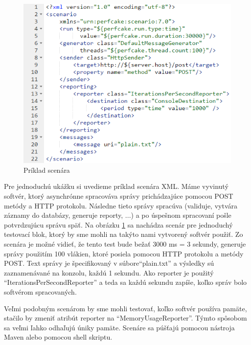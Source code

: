 
\begin{figure} [!htb]
\centering
\includegraphics[width=0.9\linewidth]{scenario.png} 
\caption{Príklad scenára}\label{scenario}
\end{figure}
Pre jednoduchú ukážku si uvedieme príklad scenára XML. Máme vyvinutý softvér, ktorý asynchrónne spracováva správy prichádzajúce pomocou POST metódy a HTTP protokolu. Následne tieto správy spracúva (validuje, vytvára záznamy do databázy, generuje reporty, ...) a po úspešnom spracovaní pošle potvrdzujúcu správu späť.
Na obrázku \ref{scenario} sa nachádza scenár pre jednoduchý testovací blok, ktorý by sme mohli na takýto nami vytvorený softvér použiť. Zo scenára je možné vidieť, že tento test bude bežať 3000 ms = 3 sekundy, generuje správy použitím 100 vlákien, ktoré posiela pomocou HTTP protokolu a metódy POST. Text správy je špecifikovaný v súbore``plain.txt'' a výsledky sú zaznamenávané na konzolu, každú 1 sekundu. Ako reporter je použitý ``IterationsPerSecondReporter'' a teda sa každú sekundu zapíše, koľko správ bolo softvérom spracovaných. 

Veľmi podobným scenárom by sme mohli testovať, koľko softvér používa pamäte, stačilo by zmeniť atribút reporter na ``MemoryUsageReporter''. Týmto spôsobom sa veľmi ľahko odhaľujú úniky pamäte. Scenáre sa púšťajú pomocou nástroja Maven alebo pomocou shell skriptu.




